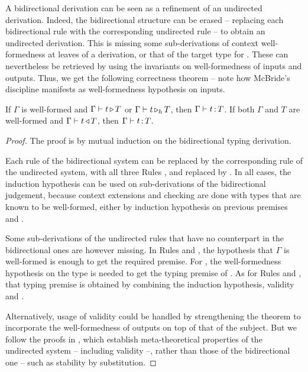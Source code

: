 A bidirectional derivation can be seen as a refinement of an undirected derivation.
Indeed, the bidirectional structure can be erased
– replacing each bidirectional rule with the corresponding undirected rule – to obtain an undirected derivation. This is missing some sub-derivations of context well-formedness at
leaves of a derivation, or that of the target type for .
These can nevertheless be retrieved by using the invariants
on well-formedness of inputs and outputs.
Thus, we get the following correctness theorem – note how McBride’s discipline manifests as well-formedness hypothesis on inputs.

\begin{theorem}
  \label{thm:corr-ccomega}
  If $\Gamma$ is well-formed and $\inferty{\Gamma}{t}{T}$ or $\pinferty{h}{\Gamma}{t}{T}$,
  then $\Gamma \vdash t \ty T$.
  If both $\Gamma$ and $T$ are well-formed and
  $\checkty{\Gamma}{t}{T}$, then $\Gamma \vdash t \ty T$. 
\end{theorem}
  
\begin{proof}
  The proof is by mutual induction on the bidirectional typing derivation.

  Each rule of the bidirectional system can be replaced by the corresponding rule of the
  undirected system, with all three Rules ,  and  replaced by
  . In all cases, the induction hypothesis can be used on sub-derivations of the bidirectional judgement, because context extensions and checking are
  done with types that are known to be well-formed,
  either by induction hypothesis on previous premises and .%

  Some sub-derivations of the undirected rules that have no counterpart
  in the bidirectional ones are however missing.
  In Rules  and ,
  the hypothesis that $\Gamma$ is well-formed is enough to get the required premise.
  For ,
  the well-formedness hypothesis on the type is needed to get the typing premise of
  .
  As for Rules  and ,
  that typing premise is obtained by combining the induction hypothesis,
  validity and .

  Alternatively, usage of validity could be handled by
  strengthening the theorem to incorporate the well-formedness of outputs on top of that of
  the subject. But we follow the proofs in , which establish
  meta-theoretical properties of the undirected system – including validity –,
  rather than those of the bidirectional one – such as stability by substitution.

\end{proof}

